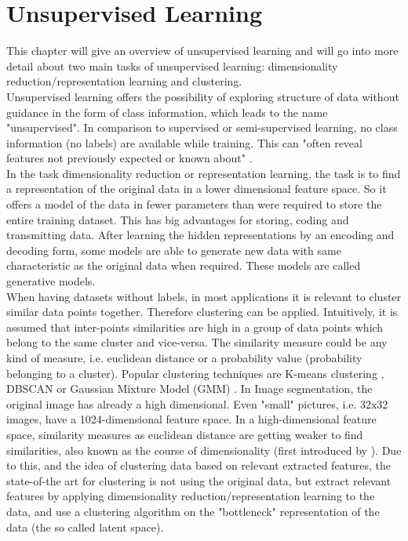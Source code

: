 \documentclass[12pt,DIV14,BCOR12mm,a4paper,footexclude,headinclude,halfparskip-,twoside,openright,cleardoubleempty,idxtotoc,bibtotoc,listtotoc]{scrreprt} %
\numberwithin{equation}{chapter}
\begin{document}
\section{Unsupervised Learning}
This chapter will give an overview of unsupervised learning and will go into more detail about two main tasks of unsupervised learning: dimensionality reduction/representation learning and clustering.\\
Unsupervised learning offers the possibility of exploring structure of data without guidance in the form of class information, which leads to the name "unsupervised". In comparison to supervised or semi-supervised learning, no class information (no labels) are available while training. This can "often reveal features not previously expected or known about" \cite{Michie-et-al-1994}.\\
In the task dimensionality reduction or representation learning, the task is to find a representation of the original data in a lower dimensional feature space. So it offers a model of the data in fewer parameters than were required to store the entire training dataset. This has big advantages for storing, coding and transmitting data. After learning the hidden representations by an encoding and decoding form, some models are able to generate new data with same characteristic as the original data when required. These models are called generative models.\\
When having datasets without labels, in most applications it is relevant to cluster similar data points together. Therefore clustering can be applied. Intuitively, it is assumed that inter-points similarities are high in a group of data points which belong to the same cluster and vice-versa. The similarity measure could be any kind of measure, i.e. euclidean distance or a probability value (probability belonging to a cluster). Popular clustering techniques are K-means clustering \cite{Lloyd82leastsquares}, DBSCAN \cite{Ester96adensity-based} or Gaussian Mixture Model (GMM) \cite{Gilles07MixtureModelsforClassification}. In Image segmentation, the original image has already a high dimensional. Even "small" pictures, i.e. 32x32 images, have a 1024-dimensional feature space. In a high-dimensional feature space, similarity measures as euclidean distance are getting weaker to find similarities, also known as the course of dimensionality (first introduced by \cite{Bellman34}). Due to this, and the idea of clustering data based on relevant extracted features, the state-of-the art for clustering is not using the original data, but extract relevant features by applying dimensionality reduction/representation learning to the data, and use a clustering algorithm on the "bottleneck" representation of the data (the so called latent space).
\end{document}
